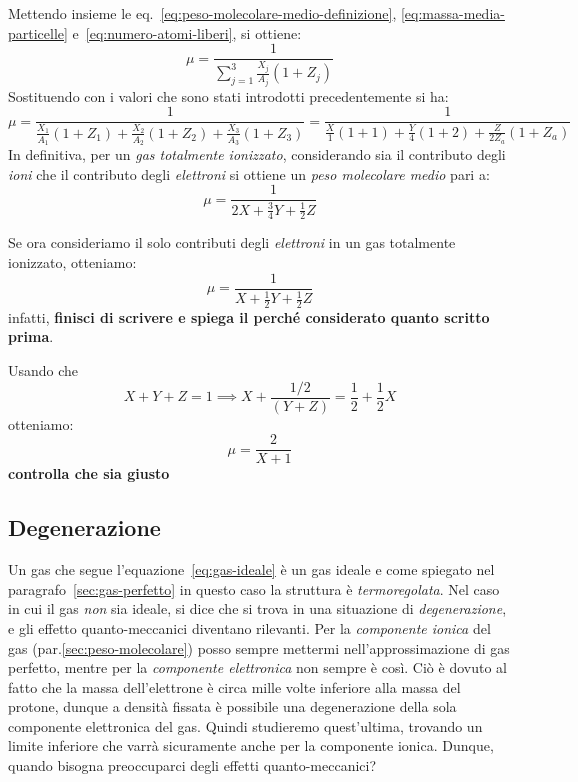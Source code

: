 Mettendo insieme le eq.~\eqref{eq:peso-molecolare-medio-definizione}, \eqref{eq:massa-media-particelle} e~\eqref{eq:numero-atomi-liberi}, si ottiene:
\begin{equation}
    \mu = \dfrac{1}{\sum_{j=1}^3 \frac{X_j}{A_j} (1+Z_j)}
\end{equation}
Sostituendo con i valori che sono stati introdotti precedentemente si ha:
\[
\mu = \dfrac{1}{\frac{X_1}{A_1}(1+Z_1) + \frac{X_2}{A_2}(1+Z_2) + \frac{X_3}{A_3}(1+Z_3)} = \dfrac{1}{\frac{X}{1}(1+1) + \frac{Y}{4}(1+2) + \frac{Z}{2 Z_a}(1+Z_a)}
\]
In definitiva, per un \emph{gas totalmente ionizzato}, considerando sia il contributo degli \emph{ioni} che il contributo degli \emph{elettroni} si ottiene un \emph{peso molecolare medio} pari a:
\begin{equation}\label{eq:peso-molecolare-gas-ionizzato}
    \mu = \dfrac{1}{2 X + \frac{3}{4} Y + \frac{1}{2} Z}
\end{equation}

Se ora consideriamo il solo contributi degli \emph{elettroni} in un gas totalmente ionizzato, otteniamo:
\begin{equation}
    \mu = \dfrac{1}{X + \frac{1}{2} Y + \frac{1}{2}Z}
\end{equation}
infatti, \textbf{finisci di scrivere e spiega il perché considerato quanto scritto prima}.

Usando che 
\[
X+Y+Z=1 \implies X + \frac{1/2}{(Y+Z)} = \frac{1}{2} + \frac{1}{2} X
\]
otteniamo:
\begin{equation}\label{eq:peso-molecolare-elettroni}
    \mu = \dfrac{2}{X+1}
\end{equation}
\textbf{controlla che sia giusto}

\subsection{Degenerazione}\label{sec:degenerazione}
Un gas che segue l'equazione~\eqref{eq:gas-ideale} è un gas ideale e come spiegato nel paragrafo~\ref{sec:gas-perfetto} in questo caso la struttura è \emph{termoregolata}. Nel caso in cui il gas \emph{non} sia ideale, si dice che si trova in una situazione di \emph{degenerazione}, e gli effetto quanto-meccanici diventano rilevanti. Per la \emph{componente ionica} del gas (par.\ref{sec:peso-molecolare}) posso sempre mettermi nell'approssimazione di gas perfetto, mentre per la \emph{componente elettronica} non sempre è così. Ciò è dovuto al fatto che la massa dell'elettrone è circa mille volte inferiore alla massa del protone, dunque a densità fissata è possibile una degenerazione della sola componente elettronica del gas. Quindi studieremo quest'ultima, trovando un limite inferiore che varrà sicuramente anche per la componente ionica. Dunque, quando bisogna preoccuparci degli effetti quanto-meccanici?

